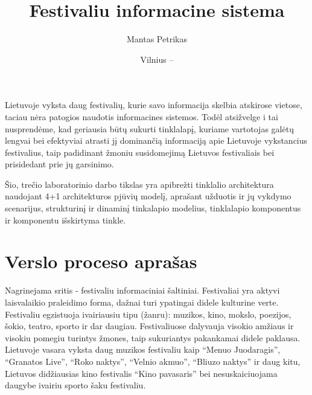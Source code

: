 ﻿\documentclass{VUMIFPSkursinis}
\title{Festivaliu informacine sistema}
\author{Mantas Petrikas}
\date{Vilnius – \the\year}
\begin{document}
\maketitle

\tableofcontents


Lietuvoje vyksta daug festivalių, kurie savo informacija skelbia atskirose vietose, taciau nėra patogios naudotis informacines sistemos. 
Todėl atsižvelge i tai nusprendėme, kad geriausia būtų sukurti tinklalapį, kuriame vartotojas galėtų lengvai bei efektyviai atrasti jį dominančią informaciją apie Lietuvoje vykstancius festivalius, taip padidinant žmoniu susidomejimą Lietuvos festivaliais bei prisidedant prie jų garsinimo.

Šio, trečio laboratorinio darbo tikslas yra apibrežti tinklalio architektura naudojant 4+1 architekturos pjūvių modelį, aprašant užduotis ir jų vykdymo scenarijus, strukturinį ir dinaminį tinkalapio modelius, tinklalapio komponentus ir komponentu išskirtyma tinkle.  

\section{Verslo proceso aprašas}

Nagrinejama sritis - festivaliu informaciniai šaltiniai. 
Festivaliai yra aktyvi laisvalaikio praleidimo forma, dažnai turi ypatingai didele kulturine verte. 
Festivaliu egzistuoja ivairiausiu tipu (žanru): muzikos, kino, mokslo, poezijos, šokio, teatro, sporto ir dar daugiau. 
Festivaliuose dalyvauja visokio amžiaus ir visokiu pomegiu turintys žmones, taip sukuriantys pakankamai didele paklausa. 
Lietuvoje vasara vyksta daug muzikos festivaliu kaip “Menuo Juodaragis”, “Granatos Live”, “Roko naktys”, “Velnio akmuo”, “Bliuzo naktys” ir daug kitu,
 Lietuvos didžiausias kino festivalis “Kino pavasaris” bei nesuskaiciuojama daugybe ivairiu sporto šaku festivaliu.
\end{document}

